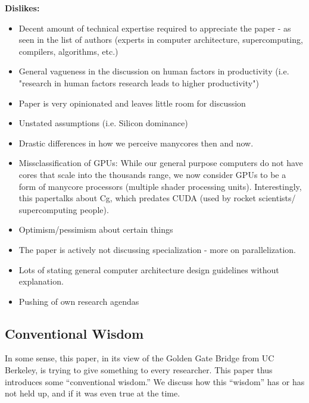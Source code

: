 \noindent \textbf{Dislikes:}

\begin{itemize}
    \item Decent amount of technical expertise required to appreciate the paper - as seen in the list of authors (experts in computer architecture, supercomputing, compilers, algorithms, etc.)
    \item General vagueness in the discussion on human factors in productivity (i.e. "research in human factors research leads to higher productivity")
    \item Paper is very opinionated and leaves little room for discussion
    \item Unstated assumptions (i.e. Silicon dominance)
    \item Drastic differences in how we perceive manycores then and now. 
    \item Missclassification of GPUs: While our general purpose computers do not have cores that scale into the thousands range, we now consider GPUs to be a form of manycore processors (multiple shader processing units). Interestingly, this papertalks about Cg, which predates CUDA (used by rocket scientists/ supercomputing people).
    \item Optimism/pessimism about certain things
    \item The paper is actively not discussing specialization - more on parallelization.
    \item Lots of stating general computer architecture design guidelines without explanation.
    \item Pushing of own research agendas
    
\end{itemize}

\subsection{Conventional Wisdom}\label{feb-11:a-view:conventional}
In some sense, this paper, in its view of the Golden Gate Bridge from UC Berkeley, is trying to give something to every researcher.
This paper thus introduces some ``conventional wisdom.''
We discuss how this ``wisdom'' has or has not held up, and if it was even true at the time.

